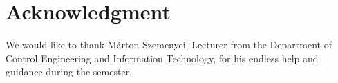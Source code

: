 \documentclass[10pt,journal,compsoc]{IEEEtran}
\begin{document}
  \section*{Acknowledgment}
\fi


We would like to thank Márton Szemenyei, Lecturer from the Department of Control Engineering and Information Technology, for his endless help and guidance during the semester.


\ifCLASSOPTIONcaptionsoff
  \newpage
\fi





%
%
%





%
%




% 
\end{document}
